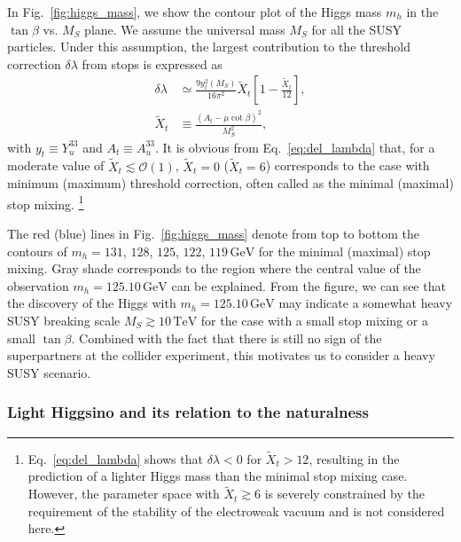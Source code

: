 \documentclass[12pt,twoside,book]{article}
\begin{document}
In Fig.~\ref{fig:higgs_mass}, we show the contour plot of the Higgs mass $m_h$ in the $\tan\beta$ vs. $M_S$ plane.
We assume the universal mass $M_S$ for all the SUSY particles.
Under this assumption, the largest contribution to the threshold correction $\delta \lambda$ from stops is expressed as
\begin{align}
  \delta \lambda &\simeq \frac{9 y_t^2 (M_S)}{16 \pi^2} \tilde{X}_t \left[ 1-\frac{\tilde{X}_t}{12} \right], \label{eq:del_lambda}\\
  \tilde{X}_t &\equiv \frac{(A_t - \mu \cot \beta)^2}{M_S^2},
\end{align}
with $y_t \equiv Y_u^{33}$ and $A_t \equiv A_u^{33}$.
It is obvious from Eq.~\eqref{eq:del_lambda} that, for a moderate value of $\tilde{X}_t \lesssim \mathcal{O}(1)$, $\tilde{X}_t = 0$ ($\tilde{X}_t = 6$) corresponds to the case with minimum (maximum) threshold correction, often called as the minimal (maximal) stop mixing.
\footnote{
  Eq.~\eqref{eq:del_lambda} shows that $\delta \lambda < 0$ for $\tilde{X}_t > 12$, resulting in the prediction of a lighter Higgs mass than the minimal stop mixing case.
  However, the parameter space with $\tilde{X}_t \gtrsim 6$ is severely constrained by the requirement of the stability of the electroweak vacuum  and is not considered here.
}

The red (blue) lines in Fig.~\ref{fig:higgs_mass} denote from top to bottom the contours of $m_h = 131$, $128$, $125$, $122$, $119\, \mathrm{GeV}$ for the minimal (maximal) stop mixing.
Gray shade corresponds to the region where the central value of the observation $m_h = 125.10\,\mathrm{GeV}$ can be explained.
From the figure, we can see that the discovery of the Higgs with $m_h = 125.10\,\mathrm{GeV}$ may indicate a somewhat heavy SUSY breaking scale $M_S \gtrsim 10\,\mathrm{TeV}$ for the case with a small stop mixing or a small $\tan \beta$.
Combined with the fact that there is still no sign of the superpartners at the collider experiment, this motivates us to consider a heavy SUSY scenario.


\subsubsection*{Light Higgsino and its relation to the naturalness}
\end{document}
